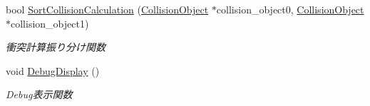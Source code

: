 \begin{DoxyCompactItemize}
bool \mbox{\hyperlink{class_collision_manager_a87f64affda1906cd6eee3d177ca25045}{Sort\+Collision\+Calculation}} (\mbox{\hyperlink{class_collision_object}{Collision\+Object}} $\ast$collision\+\_\+object0, \mbox{\hyperlink{class_collision_object}{Collision\+Object}} $\ast$collision\+\_\+object1)
\begin{DoxyCompactList}\small\item\em 衝突計算振り分け関数 \end{DoxyCompactList}\item 
void \mbox{\hyperlink{class_collision_manager_a4da1241f3905c3855b31d7e20ceed5a1}{Debug\+Display}} ()
\begin{DoxyCompactList}\small\item\em Debug表示関数 \end{DoxyCompactList}\end{DoxyCompactItemize}
